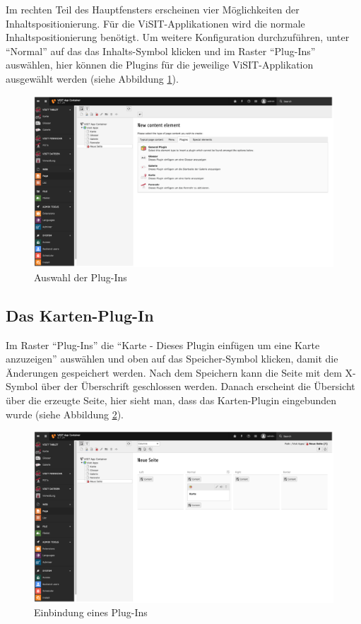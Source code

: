 Im rechten Teil des Hauptfensters erscheinen vier Möglichkeiten der Inhaltspositionierung. Für die ViSIT-Applikationen wird die normale Inhaltspositionierung benötigt.  Um weitere Konfiguration durchzuführen, unter “Normal” auf das das Inhalts-Symbol klicken und im Raster “Plug-Ins” auswählen, hier können die Plugins für die jeweilige ViSIT-Applikation ausgewählt werden (siehe Abbildung \ref{img:auswahl_plugins}).

\begin{figure}[ht!]
\centering
\includegraphics[width=12cm]{Figures/paula/typo3/auswahl_plugins.png}
\caption{Auswahl der Plug-Ins}
\label{img:auswahl_plugins}
\end{figure}

\subsection{Das Karten-Plug-In}

Im Raster “Plug-Ins” die “Karte - Dieses Plugin einfügen um eine Karte anzuzeigen” auswählen und oben auf das Speicher-Symbol klicken, damit die Änderungen gespeichert werden. Nach dem Speichern kann die Seite mit dem X-Symbol über der Überschrift geschlossen werden. Danach erscheint die Übersicht über die erzeugte Seite, hier sieht man, dass das Karten-Plugin eingebunden wurde (siehe Abbildung \ref{img:einbindung_plugins}).

\begin{figure}[ht!]
\centering
\includegraphics[width=12cm]{Figures/paula/typo3/einbindung_plugin.png}
\caption{Einbindung eines Plug-Ins}
\label{img:einbindung_plugins}
\end{figure}

